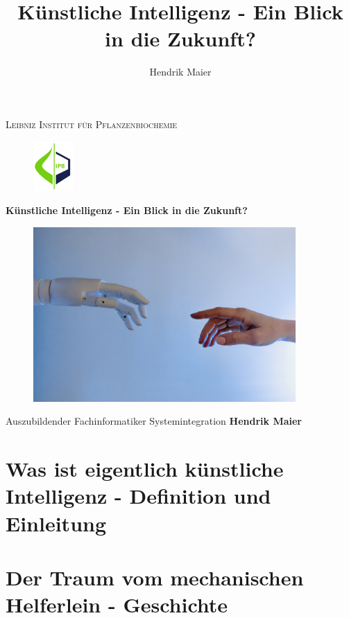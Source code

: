 \documentclass[12pt,german,ngerman]{report}
\title{Künstliche Intelligenz - Ein Blick in die Zukunft?}
\author{Hendrik Maier}
\date{}
\begin{document}
    \begin{titlepage}
        \centering
        {\scshape\LARGE Leibniz Institut für Pflanzenbiochemie\par}
        \vspace{1cm}
        \begin{figure}[h]
            \includegraphics[width=1.5cm]{ipb_logo.png}
            \centering
        \end{figure}
        {\huge\bfseries Künstliche Intelligenz - Ein Blick in die Zukunft?\par}
        \vspace{1cm}
        \begin{figure}[h]
            \includegraphics[width=10cm]{michelangelo_ki.jpg}
            \centering
        \end{figure}
        \vspace{1cm}
        {\Large Auszubildender Fachinformatiker Systemintegration \textbf{Hendrik Maier}\par}
        \vfill

    \end{titlepage}

    \tableofcontents
    \newpage

\chapter{Was ist eigentlich künstliche Intelligenz - Definition und Einleitung}
    

\chapter{Der Traum vom mechanischen Helferlein - Geschichte}
\end{document}
